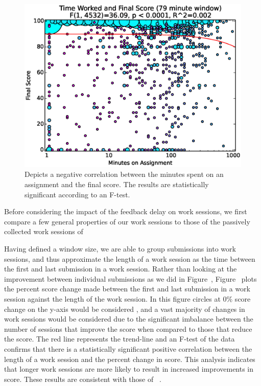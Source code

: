 \begin{figure}[!t]
\centering \includegraphics[width=5.25in]{graphs/Time_Worked_and_Final_Score_(79_minute_window).eps}
\caption{Depicts a negative correlation between the minutes spent on an
  assignment and the final score. The results are statistically significant
  according to an F-test.}
\end{figure}

Before considering the impact of the feedback delay on work sessions, we first
compare a few general properties of our work sessions to those of the passively
collected work sessions of \spacco[.]{}

Having defined a window size, we are able to group submissions into work
sessions, and thus approximate the length of a work session as the time between
the first and last submission in a work session. Rather than looking at the
improvement between individual submissions as we did in
Figure~, Figure~
plots the percent score change made between the first and last submission in a
work session against the length of the work session. In this figure circles at
0\% score change on the y-axis would be considered \noi{}, and a vast majority
of changes in work sessions would be considered \imp{} due to the significant
imbalance between the number of sessions that improve the score when compared
to those that reduce the score. The red line represents the trend-line and an
F-test of the data confirms that there is a statistically significant positive
correlation between the length of a work session and the percent change in
score. This analysis indicates that longer work sessions are more likely to
result in increased improvements in score. These results are consistent with
those of \spacco{}~\cite{Spacco:2013:TIP:2462476.2465594}.

